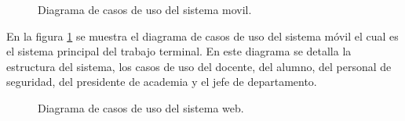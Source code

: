 \begin{figure}[htbp!]
	\begin{center}
		\caption{Diagrama de casos de uso del sistema movil.}
		\label{fig:casosDeUso1}
	\end{center}
\end{figure}
En la figura \ref{fig:casosDeUso1} se muestra el diagrama de casos de uso del sistema móvil el cual es el sistema principal del trabajo terminal. En este diagrama se detalla la estructura del sistema, los casos de uso del docente, del alumno, del personal de seguridad, del presidente de academia y el jefe de departamento.

\newpage

\begin{figure}[htbp!]
	\begin{center}
		\caption{Diagrama de casos de uso del sistema web.}
		\label{fig:casosDeUso2}
	\end{center}
\end{figure}


